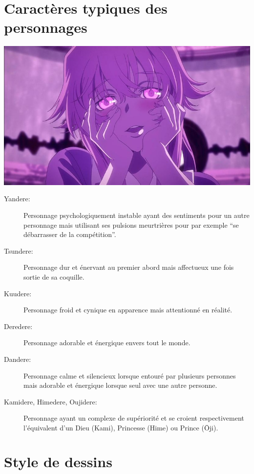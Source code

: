 \section[Caractères]{Caractères typiques des personnages}

\begin{center}
	\includegraphics[scale=0.5]{Yandere.jpg}
\end{center}

\begin{description}
	\item[Yandere:] Personnage psychologiquement instable ayant des
		sentiments pour un autre personnage mais utilisant ses pulsions
		meurtrières pour par exemple ``se débarrasser de la compétition''.
	\item[Tsundere:] Personnage dur et énervant au premier abord mais
		affectueux une fois sortie de sa coquille.
	\item[Kuudere:] Personnage froid et cynique en apparence mais attentionné
		en réalité.
	\item[Deredere:] Personnage adorable et énergique envers tout le monde.
	\item[Dandere:] Personnage calme et silencieux lorsque entouré par
		plusieurs personnes mais adorable et énergique lorsque seul avec une
		autre personne.
	\item[Kamidere, Himedere, Oujidere:] Personnage ayant un complexe
		de supériorité et se croient respectivement l'équivalent d'un
		Dieu (Kami), Princesse (Hime) ou Prince (\=Oji).
\end{description}

\section{Style de dessins}

